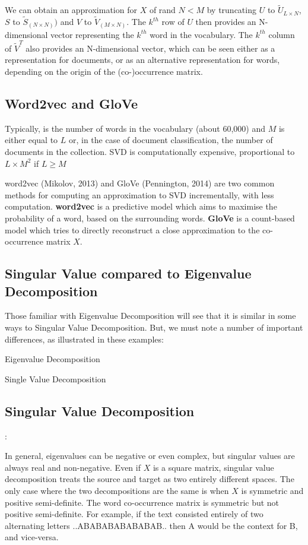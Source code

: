 \documentclass[11pt]{article}
\begin{document}
We can obtain an approximation for $X$ of rand $N < M$ by truncating $U$ to $\tilde{U}_{L \times N}$, $S$ to $\tilde{S}_{(N \times N)})$ and $V$ to $\tilde{V}_{(M \times N)}$.
The $k^{th}$ row of $U$ then provides an N-dimensional vector representing the $k^{th}$ word in the vocabulary.
The $k^{th}$ column of $\tilde{V}^T$ also provides an N-dimensional vector, which can be seen either as a representation for documents, or as an alternative representation for words, depending on the origin of the (co-)occurrence matrix.

\subsection{Word2vec and GloVe}\label{subsec:word2vec-and-glove}
Typically, is the number of words in the vocabulary (about 60,000) and $M$ is either equal to $L$ or, in the case of document classification, the number of documents in the collection.
SVD is computationally expensive, proportional to $L \times M^2$ if $L \geq M$

word2vec (Mikolov, 2013) and GloVe (Pennington, 2014) are two common methods for computing an approximation to SVD incrementally, with less computation.
\textbf{word2vec} is a predictive model which aims to maximise the probability of a word, based on the surrounding words.
\textbf{GloVe} is a count-based model which tries to directly reconstruct a close approximation to the co-occurrence matrix $X$.

\subsection{Singular Value compared to Eigenvalue Decomposition}\label{subsec:singular-value-compared-to-eigenvalue-decomposition}
Those familiar with Eigenvalue Decomposition will see that it is similar in some ways to Singular Value Decomposition.
But, we must note a number of important differences, as illustrated in these examples:

Eigenvalue Decomposition
\[\]

Single Value Decomposition
\[\]

\subsection{Singular Value Decomposition}\label{subsec:singular-value-decomposition}:

In general, eigenvalues can be negative or even complex, but singular values are always real and non-negative.
Even if $X$ is a square matrix, singular value decomposition treats the source and target as two entirely different spaces.
The only case where the two decompositions are the same is when $X$ is symmetric and positive semi-definite.
The word co-occurrence matrix is symmetric but not positive semi-definite.
For example, if the text consisted entirely of two alternating letters ..ABABABABABABAB.. then A would be the context for B, and vice-versa.
\end{document}
